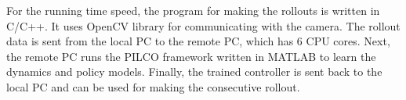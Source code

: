 \begin{figure}[!ht]
    \centering
    \begin{floatrow}
    \end{floatrow}
\end{figure}

\noindent For the running time speed, the program for making the rollouts is written in C/C++. It uses OpenCV library for communicating with the camera. The rollout data is sent from the local PC to the remote PC, which has 6 CPU cores. Next, the remote PC runs the PILCO framework written in MATLAB to learn the dynamics and policy models. Finally, the trained controller is sent back to the local PC and can be used for making the consecutive rollout.

